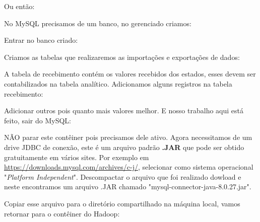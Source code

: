 \documentclass[a4paper,11pt]{article}
\begin{document}
Ou então: \\

No MySQL precisamos de um banco, no gerenciado criamos: \\

Entrar no banco criado:

Criamos as tabelas que realizaremos as importações e exportações de dados: \\

A tabela de recebimento contém os valores recebidos dos estados, esses devem ser contabilizados na tabela analítico. Adicionamos alguns registros na tabela recebimento: \\

Adicionar outros pois quanto mais valores melhor. E nosso trabalho aqui está feito, sair do MySQL: \\

NÃO parar este contêiner pois precisamos dele ativo. Agora necessitamos de um drive JDBC de conexão, este é um arquivo padrão \textbf{.JAR} que pode ser obtido gratuitamente em vários sites. Por exemplo em \url{https://downloads.mysql.com/archives/c-j/}, selecionar como sistema operacional "\textit{Platform Independent}". Descompactar o arquivo que foi realizado dowload e neste encontramos um arquivo .JAR chamado "mysql-connector-java-8.0.27.jar".

Copiar esse arquivo para o diretório compartilhado na máquina local, vamos retornar para o contêiner do Hadoop: \\
\end{document}
